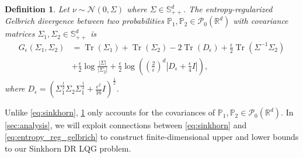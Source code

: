 \documentclass[letterpaper, 10 pt, conference]{ieeeconf}  %
\theoremstyle{ieeeconf}
\newtheorem{definition}{Definition}
\newtheorem{remark}{Remark}
\DeclareMathOperator{\Tr}{Tr}
\newcommand{\Q}{\mathbb{Q}}
\newcommand{\Symm}{\mathbb{S}}
\begin{document}
\begin{definition}
\label{def:entropy_reg_gelbrich}
    Let $\nu\sim\mathcal{N}(0, \Sigma)$ where $\Sigma \in \Symm^d_{++}$. The entropy-regularized Gelbrich divergence between two probabilities $\mathbb{P}_1, \mathbb{P}_2 \in \mathcal{P}_0(\mathbb{R}^d)$ with covariance matrices $\Sigma_1, \Sigma_2\in\Symm_{++}^d$ is
    \begin{align}
    G_\epsilon(\Sigma_1, \Sigma_2)\! &=\! \Tr(\Sigma_1)\! +\! \Tr(\Sigma_2)\! -\! 2\Tr(D_\epsilon) 
    \!+\! \frac{\epsilon}{2}\Tr\left(\Sigma^{-1}\Sigma_2\right)\nonumber \\
    &+ \frac{\epsilon}{2}\log\frac{|\Sigma|}{|\Sigma_2|} 
    \!+\! \frac{\epsilon}{2}\log\left(\left(\frac{2}{\epsilon}\right)^d \left|D_\epsilon + \frac{\epsilon}{4}I\right|\right),\label{eq:entropy_reg_gelbrich}
    \end{align}
where $D_\epsilon = \left(\Sigma_1^\frac{1}{2}\Sigma_2\Sigma_1^\frac{1}{2} + \frac{\epsilon^2}{16}I\right)^\frac{1}{2}$.
\end{definition}

Unlike \eqref{eq:sinkhorn}, \cref{def:entropy_reg_gelbrich} only accounts for the covariances of $\mathbb{P}_1, \mathbb{P}_2 \in \mathcal{P}_0(\mathbb{R}^d)$. In \cref{sec:analysis}, we will exploit connections between \eqref{eq:sinkhorn} and \eqref{eq:entropy_reg_gelbrich} to construct finite-dimensional upper and lower bounds to our Sinkhorn DR LQG problem.
    
\end{document}
